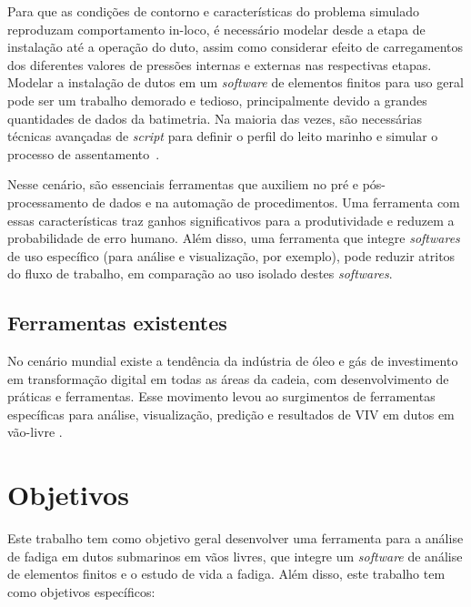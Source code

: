 Para que as condições de contorno e características do problema simulado reproduzam comportamento in-loco, é necessário modelar desde a etapa de instalação até a operação do duto, assim como considerar efeito de carregamentos dos diferentes valores de pressões internas e externas nas respectivas etapas.
Modelar a instalação de dutos em um \textit{software} de elementos finitos para uso geral pode ser um trabalho demorado e tedioso, principalmente devido a grandes quantidades de dados da batimetria.
Na maioria das vezes, são necessárias técnicas avançadas de \textit{script} para definir o perfil do leito marinho e simular o processo de assentamento~\cite{VandenAbeele2013}.

Nesse cenário, são essenciais ferramentas que auxiliem no pré e pós-processamento de dados e na automação de procedimentos.
Uma ferramenta com essas características traz ganhos significativos para a produtividade e reduzem a probabilidade de erro humano.
Além disso, uma ferramenta que integre \textit{softwares} de uso específico (para análise e visualização, por exemplo), pode reduzir atritos do fluxo de trabalho, em comparação ao uso isolado destes \textit{softwares}.


\subsection{Ferramentas existentes}


No cenário mundial existe a tendência da indústria de óleo e gás de investimento em transformação digital em todas as áreas da cadeia, com desenvolvimento de práticas e ferramentas. Esse movimento levou ao surgimentos de ferramentas específicas para análise, visualização, predição e resultados de VIV em dutos em vão-livre \cite{Mittal2017}.





\section{Objetivos}

Este trabalho tem como objetivo geral desenvolver uma ferramenta para a análise de fadiga em dutos submarinos em vãos livres,
que integre um \textit{software} de análise de elementos finitos e o estudo de vida a fadiga.
Além disso, este trabalho tem como objetivos específicos:

